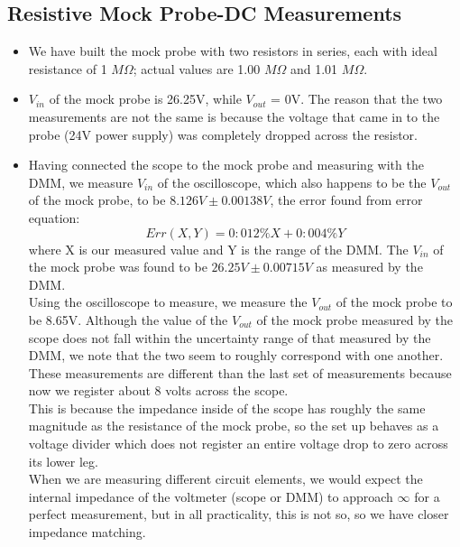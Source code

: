 \documentclass{article}
\begin{document}
\subsection{Resistive Mock Probe-DC Measurements}
    \begin{itemize}
        \item We have built the mock probe with two resistors in series, each with ideal resistance of 1 $M\Omega$; actual values are 1.00 $M\Omega$ and 1.01 $M\Omega$. 
        \item $V_{in}$ of the mock probe is 26.25V, while $V_{out}$ = 0V. The reason that the two measurements are not the same is because the voltage that came in to the probe (24V power supply) was completely dropped across the resistor.
        \item Having connected the scope to the mock probe and measuring with the DMM, we measure $V_{in}$ of the oscilloscope, which also happens to be the $V_{out}$ of the mock probe, to be $8.126V \pm 0.00138V$, the error found from error equation:
        \begin{equation}
            Err(X,Y) = 0:012\%X+ 0:004\%Y
        \end{equation}
        where X is our measured value and Y is the range of the DMM. The $V_{in}$ of the mock probe was found to be $26.25V \pm 0.00715V$ as measured by the DMM. \\\indent Using the oscilloscope to measure, we measure the $V_{out}$ of the mock probe to be 8.65V. Although the value of the $V_{out}$ of the mock probe measured by the scope does not fall within the uncertainty range of that measured by the DMM, we note that the two seem to roughly correspond with one another. These measurements are different than the last set of measurements because now we register about 8 volts across the scope.\\\indent This is because the impedance inside of the scope has roughly the same magnitude as the resistance of the mock probe, so the set up behaves as a voltage divider which does not register an entire voltage drop to zero across its lower leg. \\\indent When we are measuring different circuit elements, we would expect the internal impedance of the voltmeter (scope or DMM) to approach  $\infty$ for a perfect measurement, but in all practicality, this is not so, so we have closer impedance matching.
    \end{itemize}
\end{document}
